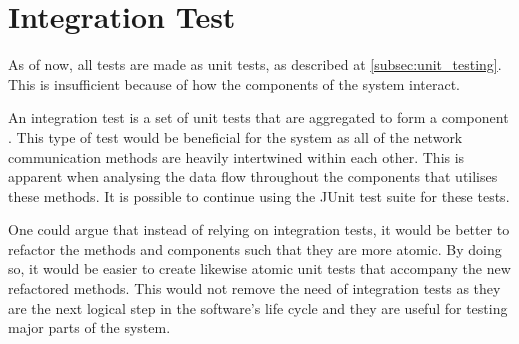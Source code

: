 \section{Integration Test}\label{int_testing}
As of now, all tests are made as unit tests, as described at \cref{subsec:unit_testing}. This is insufficient because of how the components of the system interact.

An integration test is a set of unit tests that are aggregated to form a component \cite{msdn_it}. This type of test would be beneficial for the system as all of the network communication methods are heavily intertwined within each other. This is apparent when analysing the data flow throughout the components that utilises these methods. It is possible to continue using the JUnit test suite for these tests.

One could argue that instead of relying on integration tests, it would be better to refactor the methods and components such that they are more atomic. By doing so, it would be easier to create likewise atomic unit tests that accompany the new refactored methods. This would not remove the need of integration tests as they are the next logical step in the software's life cycle and they are useful for testing major parts of the system. 


